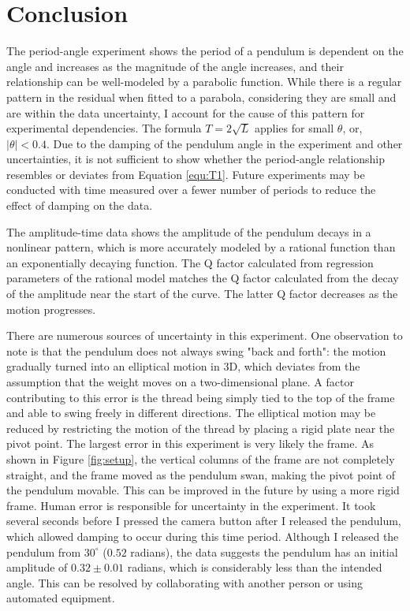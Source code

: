 \documentclass[12pt]{article}
\begin{document}


\section{Conclusion}

The period-angle experiment shows the period of a pendulum is dependent on the angle and increases as the magnitude of the angle increases, and their relationship can be well-modeled by a parabolic function. While there is a regular pattern in the residual when fitted to a parabola, considering they are small and are within the data uncertainty, I account for the cause of this pattern for experimental dependencies. The formula $T=2\sqrt{L}$ applies for small $\theta$, or, $|\theta|<0.4$. Due to the damping of the pendulum angle in the experiment and other uncertainties, it is not sufficient to show whether the period-angle relationship resembles or deviates from Equation \ref{equ:T1}. Future experiments may be conducted with time measured over a fewer number of periods to reduce the effect of damping on the data.

The amplitude-time data shows the amplitude of the pendulum decays in a nonlinear pattern, which is more accurately modeled by a rational function than an exponentially decaying function. The Q factor calculated from regression parameters of the rational model matches the Q factor calculated from the decay of the amplitude near the start of the curve. The latter Q factor decreases as the motion progresses.

There are numerous sources of uncertainty in this experiment. One observation to note is that the pendulum does not always swing "back and forth": the motion gradually turned into an elliptical motion in 3D, which deviates from the assumption that the weight moves on a two-dimensional plane. A factor contributing to this error is the thread being simply tied to the top of the frame and able to swing freely in different directions. The elliptical motion may be reduced by restricting the motion of the thread by placing a rigid plate near the pivot point. The largest error in this experiment is very likely the frame. As shown in Figure \ref{fig:setup}, the vertical columns of the frame are not completely straight, and the frame moved as the pendulum swan, making the pivot point of the pendulum movable. This can be improved in the future by using a more rigid frame. Human error is responsible for uncertainty in the experiment. It took several seconds before I pressed the camera button after I released the pendulum, which allowed damping to occur during this time period. Although I released the pendulum from $30^\circ$ ($0.52$ radians), the data suggests the pendulum has an initial amplitude of $0.32\pm0.01$ radians, which is considerably less than the intended angle. This can be resolved by collaborating with another person or using automated equipment.




\end{document}
